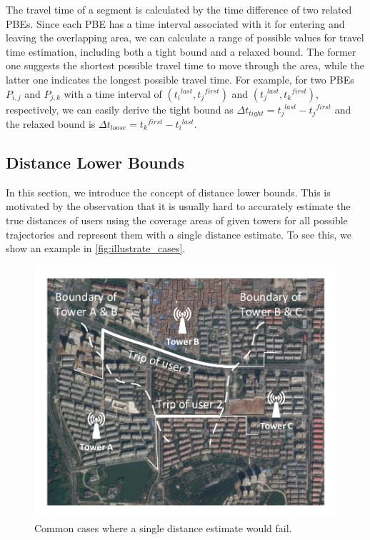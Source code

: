 The travel time of a segment is calculated by the time difference of two related PBEs. Since each PBE has a time interval associated with it for entering and leaving the overlapping area, we can calculate a range of possible values for travel time estimation, including both a tight bound and a relaxed bound. The former one suggests the shortest possible travel time to move through the area, while the latter one indicates the longest possible travel time. For example, for two PBEs $P_{i,j}$ and $P_{j,k}$ with a time interval of $({t_i}^{last}, {t_j}^{first})$ and $({t_j}^{last}, {t_k}^{first})$, respectively, we can easily derive the tight bound as $\Delta t_{tight} = {t_j}^{last} - {t_j}^{first}$ and the relaxed bound is $\Delta t_{loose} = {t_k}^{first} - {t_i}^{last}$.

\subsection{Distance Lower Bounds}

In this section, we introduce the concept of distance lower bounds. This is motivated by the observation that it is usually hard to accurately estimate the true distances of users using the coverage areas of given towers for all possible trajectories and represent them with a single distance estimate. To see this, we show an example in \autoref{fig:illustrate_cases}.

\begin{figure}[h]
    \centering
    \includegraphics[width=\linewidth]{./figures/illustrate_cases.pdf}
    \vspace{-0.4in}
    \caption{Common cases where a single distance estimate would fail.}
    \label{fig:illustrate_cases}
    \vspace{-0.1in}
\end{figure}

